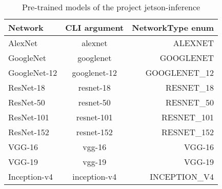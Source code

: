 \begin{table}
    \centering
    \begin{tabular}[h]{lcr}
        \textbf{Network}              & \textbf{CLI argument} & \textbf{NetworkType enum} \\ \hline
        AlexNet\index{AlexNet}        & alexnet               & ALEXNET \\
        GoogleNet\index{GoogleNet}    & googlenet             & GOOGLENET \\
        GoogleNet-12                  & googlenet-12          & GOOGLENET\_12 \\
        ResNet-18\index{ResNets}      & resnet-18             & RESNET\_18 \\
        ResNet-50                     & resnet-50             & RESNET\_50 \\
        ResNet-101                    & resnet-101            & RESNET\_101 \\
        ResNet-152                    & resnet-152            & RESNET\_152 \\
        VGG-16\index{VGG}             & vgg-16                & VGG-16 \\
        VGG-19                        & vgg-19                & VGG-19 \\
        Inception-v4\index{Inception} & inception-v4          & INCEPTION\_V4 \\
    \end{tabular}
    \caption{Pre-trained models of the project jetson-inference}\label{Database:TrainedModell}
\end{table}







%


